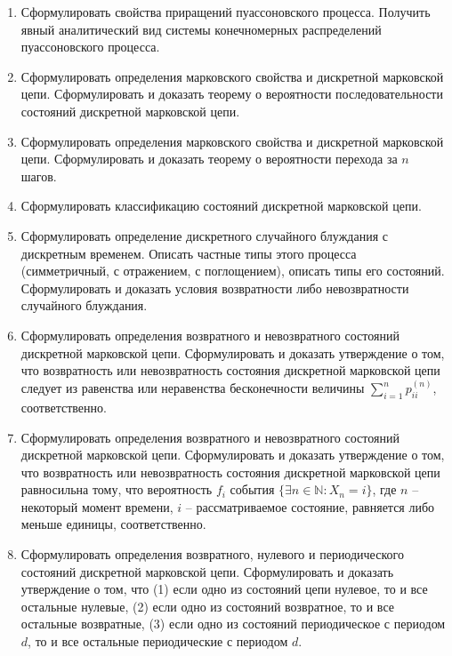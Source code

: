 \documentclass[a4paper,12pt]{extreport}
\renewcommand{\=}[1]{\stackrel{#1}{=}} %
\begin{document}
\begin{enumerate}
	\item Сформулировать свойства приращений пуассоновского процесса. 
	Получить явный аналитический вид системы конечномерных
	распределений пуассоновского процесса.

	\item Сформулировать определения марковского свойства и дискретной марковской цепи.
	Сформулировать и доказать теорему о вероятности последовательности
	состояний дискретной марковской цепи.

	\item Сформулировать определения марковского свойства и дискретной марковской цепи.
	Сформулировать и доказать теорему о вероятности перехода за $n$ шагов.

	\item Сформулировать классификацию состояний дискретной марковской цепи.

	\item Сформулировать определение дискретного случайного блуждания
	с дискретным временем. Описать частные типы этого процесса
	(симметричный, с отражением, с поглощением), описать типы
	его состояний. Сформулировать и доказать условия возвратности либо
	невозвратности случайного блуждания.

	\item Сформулировать определения возвратного и невозвратного состояний
	дискретной марковской цепи. Сформулировать и доказать утверждение
	о том, что возвратность или невозвратность состояния дискретной марковской цепи 
	следует из равенства или неравенства бесконечности
	величины $\sum\limits_{i=1}^n p^{(n)}_{ii}$, соответственно.

	\item Сформулировать определения возвратного и невозвратного состояний
	дискретной марковской цепи. Сформулировать и доказать утверждение
	о том, что возвратность или невозвратность состояния дискретной марковской цепи 
	равносильна тому, что вероятность $f_i$ события $\{\exists n \in \mathbb{N}: X_n = i\}$,
	где $n$ -- некоторый момент времени, $i$ -- рассматриваемое состояние,
	равняется либо меньше единицы, соответственно.

	\item Сформулировать определения возвратного, нулевого и периодического
	состояний дискретной марковской цепи. Сформулировать и доказать утверждение
	о том, что (1) если одно из состояний цепи нулевое, то и все остальные нулевые,
	(2) если одно из состояний возвратное, то и все остальные возвратные,
	(3) если одно из состояний периодическое с периодом $d$, то и все остальные
	периодические с периодом $d$.


\end{enumerate}
\end{document}
